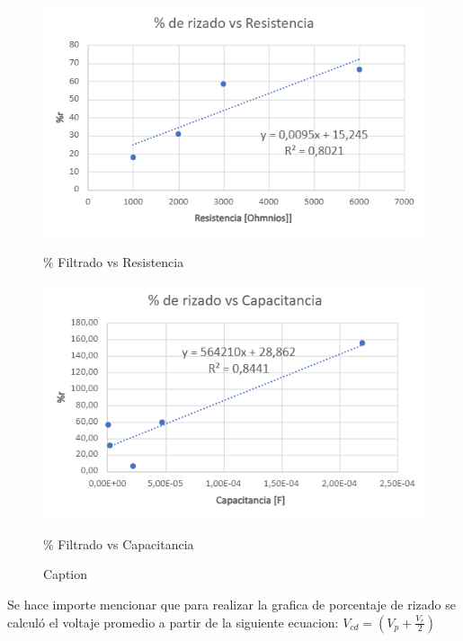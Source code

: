 \documentclass[10pt,letterpaper]{article}
\begin{document}
\begin{figure}[H]
    \centering
    \begin{minipage}[b]{0.45\textwidth}
        \centering
        \includegraphics[scale=0.65]{FiltradoResitencia_plt.png}
        \caption*{\% Filtrado vs Resistencia}
    \end{minipage}
            \begin{minipage}[b]{0.45\textwidth}
        \centering
        \includegraphics[scale=0.65]{FiltradoCapacitancia_plt.png}
        \caption*{\% Filtrado vs Capacitancia}
    \end{minipage}
    \caption{Caption}
    \label{fig:enter-label}
\end{figure}
Se hace importe mencionar que para realizar la grafica de porcentaje de rizado
se calculó el voltaje promedio a partir de la siguiente ecuacion:
$V_{cd}=(V_{p}+\frac{V_{r}}{2})$
\end{document}
